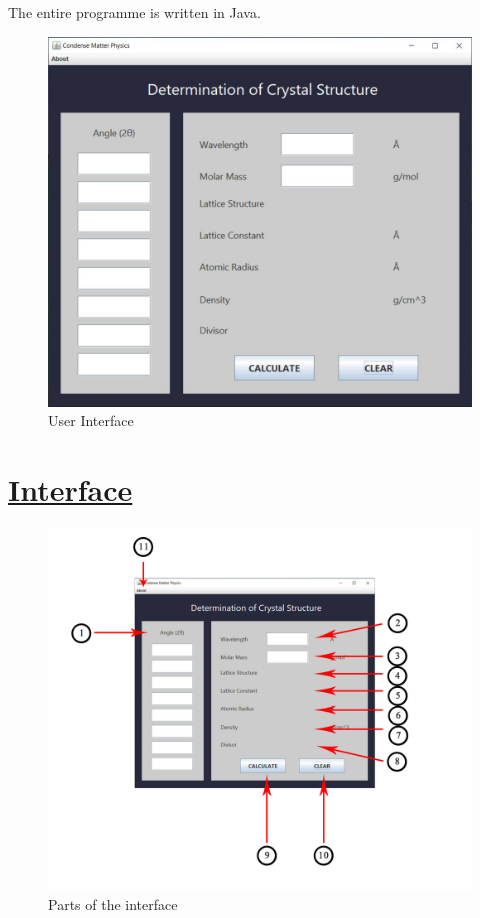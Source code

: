 \documentclass[a4paper]{article}
\begin{document}
The entire programme is written in Java.
 

\begin{figure}[h!]
\centering
\includegraphics[width=402 px,height=307.625 px]{1}
\caption{User Interface}
\end{figure}


\newpage

\section{\underline{Interface}}
\vspace{1em}

\begin{figure}[h!]
\centering
\includegraphics[width=402 px,height=307.625 px]{1.1}
\caption{Parts of the interface}
\end{figure}
\end{document}
